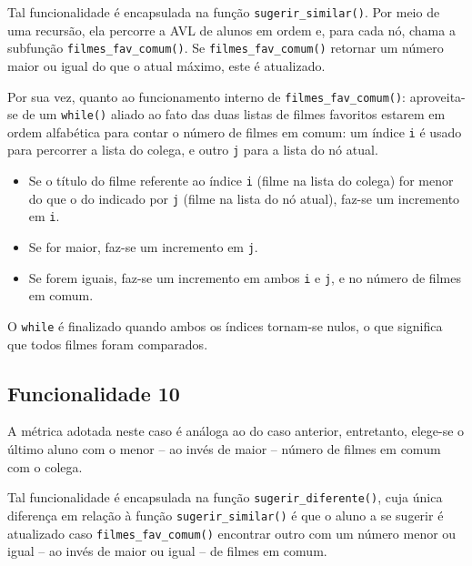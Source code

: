 \documentclass[12pt,a4paper,portuguese]{article}
\begin{document}
        Tal funcionalidade é encapsulada na função \verb|sugerir_similar()|. Por meio de uma recursão, ela percorre a AVL de alunos em ordem e, para cada nó, chama a subfunção \verb|filmes_fav_comum()|. Se \verb|filmes_fav_comum()| retornar um número maior ou igual do que o atual máximo, este é atualizado.

        Por sua vez, quanto ao funcionamento interno de \verb|filmes_fav_comum()|: aproveita-se de um \verb|while()| aliado ao fato das duas listas de filmes favoritos estarem em ordem alfabética para contar o número de filmes em comum: um índice \verb|i| é usado para percorrer a lista do colega, e outro \verb|j| para a lista do nó atual.
        \begin{itemize}
            \item Se o título do filme referente ao índice \verb|i| (filme na lista do colega) for menor do que o do indicado por \verb|j| (filme na lista do nó atual), faz-se um incremento em \verb|i|.

            \item Se for maior, faz-se um incremento em \verb|j|.

            \item Se forem iguais, faz-se um incremento em ambos \verb|i| e \verb|j|, e no número de filmes em comum.
        \end{itemize}
        O \verb|while| é finalizado quando ambos os índices tornam-se nulos, o que significa que todos filmes foram comparados.

    \subsection*{Funcionalidade 10}
        A métrica adotada neste caso é análoga ao do caso anterior, entretanto, elege-se o último aluno com o menor -- ao invés de maior -- número de filmes em comum com o colega.

        Tal funcionalidade é encapsulada na função \verb|sugerir_diferente()|, cuja única diferença em relação à função \verb|sugerir_similar()| é que o aluno a se sugerir é atualizado caso \verb|filmes_fav_comum()| encontrar outro com um número menor ou igual -- ao invés de maior ou igual -- de filmes em comum.
\end{document}
